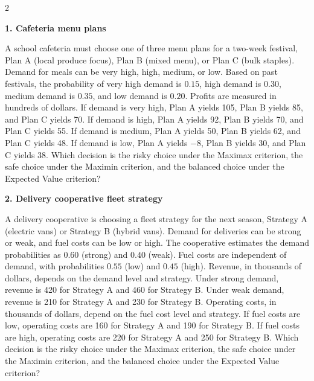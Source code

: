 \documentclass[12pt]{article}
\newcommand{\SubsectionBox}[1]{%
	\noindent\colorbox{gray!30}{%
		\parbox{\linewidth}{\textbf{#1}}%
	}\par\vspace{0.35cm}%
}
\begin{document}
	\begin{multicols}{2}

		\SubsectionBox{1. Cafeteria menu plans}\vspace{-0.25cm}
		A school cafeteria must choose one of three menu plans for a two-week festival, Plan A (local produce focus),
		Plan B (mixed menu), or Plan C (bulk staples). Demand for meals can be very high, high, medium, or low. Based on past festivals, the probability of very high demand is $0.15$, high demand is $0.30$, medium demand is $0.35$, and low demand is $0.20$. Profits are measured in hundreds of dollars. If demand is very high, Plan A yields 105, Plan B yields 85, and Plan C yields 70. If demand is high, Plan A yields 92, Plan B yields 70, and Plan C yields 55. If demand is medium, Plan A yields 50, Plan B yields 62, and Plan C yields 48. If demand is low, Plan A yields $-8$, Plan B yields 30, and Plan C yields 38. Which decision is the risky choice under the Maximax criterion, the safe choice under the Maximin criterion, and the balanced choice under the Expected Value criterion?

		\vspace{0.25cm}
		\SubsectionBox{2. Delivery cooperative fleet strategy}\vspace{-0.25cm}
		A delivery cooperative is choosing a fleet strategy for the next season, Strategy A (electric vans)
		or Strategy B (hybrid vans). Demand for deliveries can be strong or weak, and fuel costs can be low or high. The cooperative estimates the demand probabilities as $0.60$ (strong) and $0.40$ (weak). Fuel costs are independent of demand, with probabilities $0.55$ (low) and $0.45$ (high). Revenue, in thousands of dollars, depends on the demand level and strategy. Under strong demand, revenue is 420 for Strategy A and 460 for Strategy B. Under weak demand, revenue is 210 for Strategy A and 230 for Strategy B. Operating costs, in thousands of dollars, depend on the fuel cost level and strategy. If fuel costs are low, operating costs are 160 for Strategy A and 190 for Strategy B. If fuel costs are high, operating costs are 220 for Strategy A and 250 for Strategy B. Which decision is the risky choice under the Maximax criterion, the safe choice under the Maximin criterion, and the balanced choice under the Expected Value criterion?
		

\end{multicols}
\end{document}
